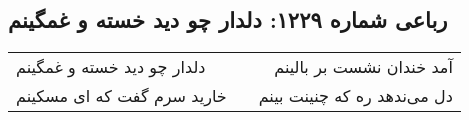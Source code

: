\begin{center}
\section*{رباعی شماره ۱۲۲۹: دلدار چو دید خسته و غمگینم}
\label{sec:1229}
\begin{longtable}{l p{0.5cm} r}
دلدار چو دید خسته و غمگینم
&&
آمد خندان نشست بر بالینم
\\
خارید سرم گفت که ای مسکینم
&&
دل می‌ندهد ره که چنینت بینم
\\
\end{longtable}
\end{center}

